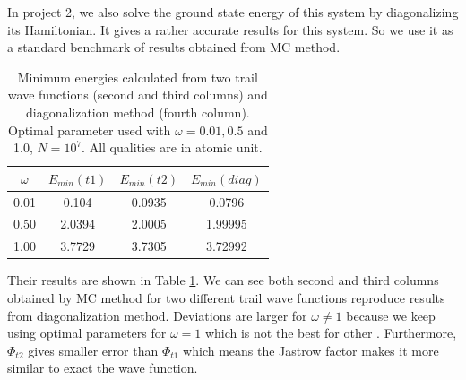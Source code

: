 In project 2, we also solve the ground state energy of this system by diagonalizing its Hamiltonian.
It gives a rather accurate results for this system.
So we use it as a standard benchmark of results obtained from MC method.
\begin{table}[tb]
	\centering
	\caption{Minimum energies calculated from two trail wave functions (second and third columns) and diagonalization method (fourth column). Optimal parameter used with $\omega=0.01,0.5$ and 1.0, $N=10^7$. All qualities are in atomic unit.}
	\label{tab:diag}
	\begin{tabular}{cccc}
		\hline
		\hline
		$\omega$   &$E_{min}(t1)$ & $E_{min}(t2)$ & $E_{min}(diag)$ \\
		\hline
		0.01 &0.104 &0.0935 &0.0796  \\
		0.50 &2.0394 &2.0005 &1.99995  \\
		1.00 &3.7729 &3.7305 &3.72992 \\
		\hline
		\hline
	\end{tabular}
\end{table}
Their results are shown in Table \ref{tab:diag}.
We can see both second and third columns obtained by MC method for two different trail wave functions  reproduce results from diagonalization method.
Deviations are larger for $\omega \neq 1$ because we keep using optimal parameters for $\omega=1$ which is not the best for other .
Furthermore, $\Phi_{t2}$ gives smaller error than $\Phi_{t1}$ which means the Jastrow factor makes it more similar to exact the wave function.
